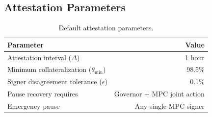 \subsection{Attestation Parameters}

\begin{table}[h]
\centering
\small
\caption{Default attestation parameters.}
\label{tab:attestation_params}
\begin{tabular}{@{}lr@{}}
\toprule
\textbf{Parameter} & \textbf{Value} \\
\midrule
Attestation interval ($\Delta$) & 1 hour \\
Minimum collateralization ($\theta_{\min}$) & 98.5\% \\
Signer disagreement tolerance ($\epsilon$) & 0.1\% \\
Pause recovery requires & Governor + MPC joint action \\
Emergency pause & Any single MPC signer \\
\bottomrule
\end{tabular}
\end{table}

